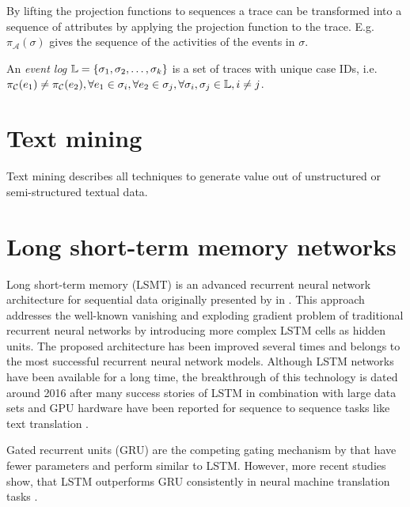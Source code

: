 By lifting the projection functions to sequences a trace can be transformed into a sequence of attributes by applying the projection function to the trace.
E.g. $\pi_\mathcal{A}(\sigma)$ gives the sequence of the activities of the events in $\sigma$.

\begin{definition}
	An \textit{event log} $\mathbb{L} = \{ \sigma_1, \sigma _2, \dots, \sigma_k \}$ is a set of traces with unique case IDs, i.e. $\pi_\mathcal{C}(e_1) \neq \pi_\mathcal{C}(e_2), \forall e_1 \in \sigma_i, \forall e_2 \in \sigma_j, \forall \sigma_i, \sigma_j \in \mathbb{L}, i \neq j$.
\end{definition}

\section{Text mining}

Text mining describes all techniques to generate value out of unstructured or semi-structured textual data.

\section{Long short-term memory networks}

Long short-term memory (LSMT) is an advanced recurrent neural network architecture for sequential data originally presented by \citeauthor{DBLP:journals/neco/HochreiterS97} in \citeyear{DBLP:journals/neco/HochreiterS97}  \cite{DBLP:journals/neco/HochreiterS97}.
This approach addresses the well-known vanishing and exploding gradient problem \cite{DBLP:conf/icml/PascanuMB13}  of traditional recurrent neural networks by introducing more complex LSTM cells as hidden units.
The proposed architecture has been improved several times \cite{DBLP:journals/neco/GersSC00} \cite {DBLP:journals/tnn/GreffSKSS17} and belongs to the most successful recurrent neural network models.
Although LSTM networks have been available for a long time, the breakthrough of this technology is dated around 2016 after many success stories of LSTM in combination with large data sets and GPU hardware have been reported for sequence to sequence tasks like text translation \cite{DBLP:journals/corr/WuSCLNMKCGMKSJL16}.

Gated recurrent units (GRU) \cite{DBLP:conf/emnlp/ChoMGBBSB14} are the competing gating mechanism by \citeauthor{DBLP:conf/emnlp/ChoMGBBSB14} that have fewer parameters and perform similar to LSTM.
However, more recent studies show, that LSTM outperforms GRU consistently in neural machine translation tasks \cite{DBLP:journals/corr/BritzGLL17}.

